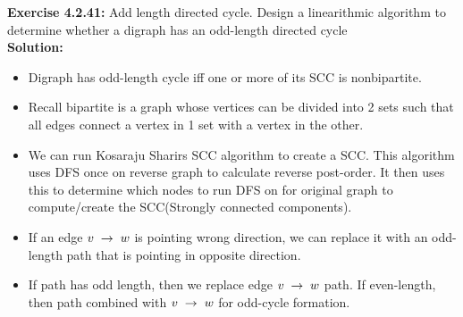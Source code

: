 \documentclass[11pt,fleqn]{article}
\begin{document}
\textbf{Exercise 4.2.41:} Add length directed cycle. Design a linearithmic algorithm to determine whether a digraph has an odd-length directed cycle\\

\textbf{Solution:}
\begin{itemize}
	\item Digraph has odd-length cycle iff one or more of its SCC is nonbipartite.
	
	\item Recall bipartite is a graph whose vertices can be divided into 2 sets such that all edges connect a vertex in 1 set with a vertex in the other.
	
	\item We can run Kosaraju Sharirs SCC algorithm to create a SCC. This algorithm uses DFS once on reverse graph to calculate reverse post-order. It then uses this to determine which nodes to run DFS on for original graph to compute/create the SCC(Strongly connected components).
	
	\item If an edge $v \thickspace \rightarrow \thickspace w$ is pointing wrong direction, we can replace it with an odd-length path that is pointing in opposite direction.
	
	\item If path has odd length, then we replace edge $v \thickspace \rightarrow \thickspace w$ path. If even-length, then path combined with $v \thickspace \rightarrow \thickspace w$ for odd-cycle formation.
\end{itemize}
\end{document}
